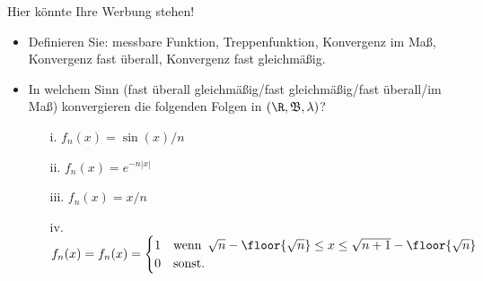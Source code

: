 \begin{exercise}

Hier könnte Ihre Werbung stehen!

\begin{itemize}
  \item Definieren Sie: messbare Funktion, Treppenfunktion, Konvergenz im Maß, Konvergenz fast überall, Konvergenz fast gleichmäßig.
  \item In welchem Sinn (fast überall gleichmäßig/fast gleichmäßig/fast überall/im Maß) konvergieren die folgenden Folgen in $(\R, \mathfrak{B}, \lambda)$?
  \begin{itemize}
    \item[i.] $f_n(x) = \sin(x)/n$
    \item[ii.] $f_n(x) = e^{-n |x|}$
    \item[iii.] $f_n(x) = x/n$
    \item[iv.] $f_n(x) = f_n(x) =
    \begin{cases}
      1 & \text{wenn} \enspace \sqrt{n} - \floor{\sqrt{n}} \leq x \leq \sqrt{n+1} - \floor{\sqrt{n}} \\
      0 & \text{sonst}.
    \end{cases}$
  \end{itemize}
\end{itemize}

\end{exercise}


